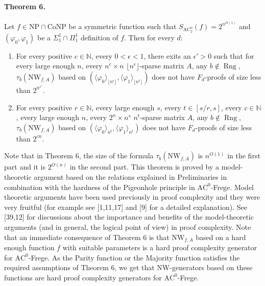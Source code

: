 \paragraph{Theorem 6.} Let $f\in\mathrm{NP}\cap\mathrm{CoNP}$ be a symmetric function such that $S_{\mathrm{AC}_2^0}(f)=2^{n^{\Omega(1)}}$ and $(\varphi_0,\varphi_1)$ be a $\Sigma_1^1\cap\Pi_1^1$ definition of $f$. Then for every $d$:
\begin{enumerate}
\item For every positive $c\in\mathbb N$, every $0<\epsilon<1$, there exits an $\epsilon'>0$ such that for every large enough $n$, every $n^c\times n$ $\lfloor n^\epsilon\rfloor$-sparse matrix $A$, any $b\notin\operatorname{Rng}$, $\tau_b(\mathrm{NW}_{f,A})$ based on $(\langle\varphi_0\rangle_{\lfloor n^\epsilon\rfloor},\langle\varphi_1\rangle_{\lfloor n^\epsilon\rfloor})$ does not have $F_d$-proofs of size less than $2^{n^{\epsilon'}}$.
\item For every positive $r\in\mathbb N$, every large enough $s$, every $t\in[s/r,s]$, every $c\in\mathbb N$, every large enough $n$, every $2^n\times n^s$ $n^t$-sparse matrix $A$, any $b\notin\operatorname{Rng}$, $\tau_b(\mathrm{NW}_{f,A})$ based on $(\langle\varphi_0\rangle_{n^t},\langle\varphi_1\rangle_{n^t})$ does not have $F_d$-proofs of size less than $2^{cn}$.
\end{enumerate}
Note that in Theorem 6, the size of the formula $\tau_b(\mathrm{NW}_{f,A})$ is $n^{O(1)}$ in the first part and it is $2^{O(n)}$ in the second part. This theorem is proved by a model-theoretic argument based on the relations explained in Preliminaries in combination with the hardness of the Pigeonhole principle in $\mathrm{AC}^0$-Frege. Model theoretic arguments have been used previously in proof complexity and they were very fruitful (for example see [1,11,17] and [9] for a detailed explanation). See [39,12] for discussions about the importance and benefits of the model-theoretic arguments (and in general, the logical point of view) in proof complexity.
Note that an immediate consequence of Theorem 6 is that $\mathrm{NW}_{f,A}$ based on a hard enough function $f$ with suitable parameters is a hard proof complexity generator for $\mathrm{AC}^0$-Frege. As the Parity function or the Majority function satisfies the required assumptions of Theorem 6, we get that NW-generators based on these functions are hard proof complexity generators for $\mathrm{AC}^0$-Frege.
